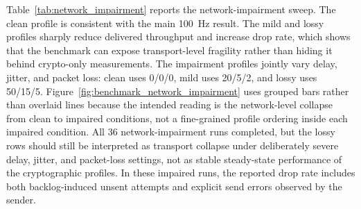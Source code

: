 Table~\ref{tab:network_impairment} reports the network-impairment sweep. The clean profile is consistent with the main 100~Hz result. The mild and lossy profiles sharply reduce delivered throughput and increase drop rate, which shows that the benchmark can expose transport-level fragility rather than hiding it behind crypto-only measurements. The impairment profiles jointly vary delay, jitter, and packet loss: clean uses 0/0/0, mild uses 20/5/2, and lossy uses 50/15/5. Figure~\ref{fig:benchmark_network_impairment} uses grouped bars rather than overlaid lines because the intended reading is the network-level collapse from clean to impaired conditions, not a fine-grained profile ordering inside each impaired condition. All 36 network-impairment runs completed, but the lossy rows should still be interpreted as transport collapse under deliberately severe delay, jitter, and packet-loss settings, not as stable steady-state performance of the cryptographic profiles. In these impaired runs, the reported drop rate includes both backlog-induced unsent attempts and explicit send errors observed by the sender.

\begin{table}[H]
\centering
\small
\caption{Network impairment at 100~Hz; crypto work is in MiB per delivered message}
\label{tab:network_impairment}
\renewcommand{\arraystretch}{1.15}
\end{table}

